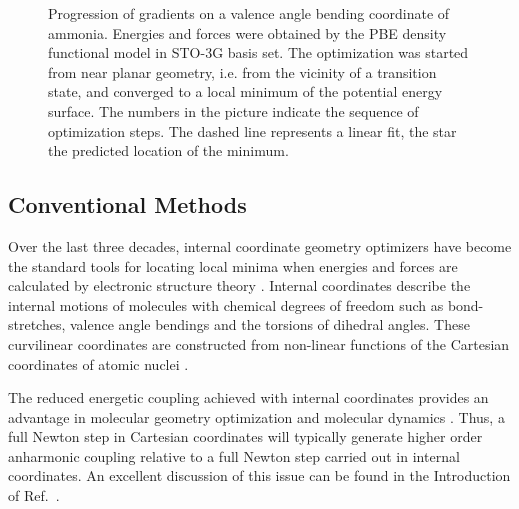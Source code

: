 \documentclass[prl,twocolumn,showpacs,twocolumngrid,superbib]{revtex4}
\begin{document}
\begin{figure}[h]
\caption{
Progression of gradients on a valence angle bending coordinate of
ammonia. Energies and forces were obtained by the PBE 
density functional model in STO-3G basis set.
The optimization was started from near planar geometry, i.e.
from the vicinity of a transition state, and converged to a local 
minimum of the potential energy surface. The numbers in the picture
indicate the sequence of optimization steps. The dashed line represents
a linear fit, the star the predicted location of the minimum.}
\label{NH3outp6}
\end{figure}

\subsection{Conventional Methods}

Over the last three decades, internal coordinate geometry optimizers have become the standard 
tools for locating local minima when energies and forces are calculated by electronic structure 
theory \cite{10papers}. Internal coordinates describe the internal motions of molecules 
with chemical degrees of freedom such as bond-stretches, valence angle bendings and the torsions 
of dihedral angles. These curvilinear coordinates are constructed from non-linear functions of the 
Cartesian coordinates of atomic nuclei \cite{wilson}.

The reduced energetic  coupling achieved with internal coordinates provides an advantage 
in molecular geometry optimization \cite{Pulay_natural_internals} and molecular dynamics \cite{pulay_dynamics}.
Thus, a full Newton step in Cartesian coordinates will typically generate higher order 
anharmonic coupling relative to a full Newton step carried out in internal coordinates.
An excellent discussion of this issue can be found in the Introduction of Ref.~\cite{Pulay_natural_internals}.
\end{document}
